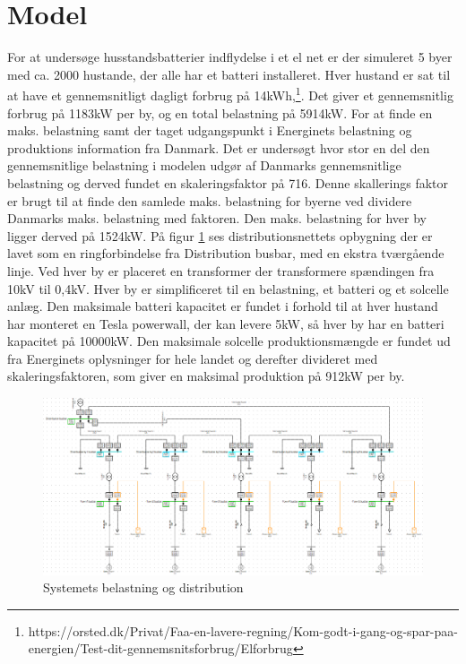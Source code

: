 

\label{Modelopbygning}

\section{Model}

For at undersøge husstandsbatterier indflydelse i et el net er der simuleret 5 byer med ca. 2000 hustande, der alle har et batteri installeret. Hver hustand er sat til at have et gennemsnitligt dagligt forbrug på 14kWh,\footnote{https://orsted.dk/Privat/Faa-en-lavere-regning/Kom-godt-i-gang-og-spar-paa-energien/Test-dit-gennemsnitsforbrug/Elforbrug}. Det giver et gennemsnitlig forbrug på 1183kW per by, og en total belastning på 5914kW. For at finde en maks. belastning samt der taget udgangspunkt i Energinets belastning og produktions information fra Danmark. Det er undersøgt hvor stor en del den gennemsnitlige belastning i modelen udgør af Danmarks gennemsnitlige belastning og derved fundet en skaleringsfaktor på 716. Denne skallerings faktor er brugt til at finde den samlede maks. belastning for byerne ved dividere Danmarks maks. belastning med faktoren. Den maks. belastning for hver by ligger derved på 1524kW. 
På figur \ref{fig:Simdis} ses distributionsnettets opbygning der er lavet som en ringforbindelse fra Distribution busbar, med en ekstra tværgående linje. Ved hver by er placeret en transformer der transformere spændingen fra 10kV til 0,4kV. Hver by er simplificeret til en belastning, et batteri og et solcelle anlæg. Den maksimale batteri kapacitet er fundet i forhold til at hver hustand har monteret en Tesla powerwall, der kan levere 5kW, så hver by har en batteri kapacitet på 10000kW. Den maksimale solcelle produktionsmængde er fundet ud fra Energinets oplysninger for hele landet og derefter divideret med skaleringsfaktoren, som giver en maksimal produktion på 912kW per by. 

 
 \begin{figure}[H] %
 	\centering
 	\includegraphics[width=1\textwidth]{figurer/Sim_model_2}
 	\caption{Systemets belastning og distribution}
 	\label{fig:Simdis}
 \end{figure}
    


